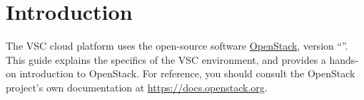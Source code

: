 \chapter*{Introduction}
The VSC cloud platform uses the open-source software
\href{https://openstack.org}{\gls{OpenStack}}, version ``\osversion''.
This guide explains the specifics of the VSC environment, and provides
a hands-on introduction to OpenStack.  For reference, you should
consult the OpenStack project's own documentation at
\url{https://docs.openstack.org}.


